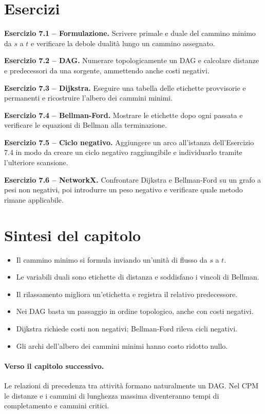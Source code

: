 \documentclass[11pt,a4paper]{article}
\begin{document}
\section{Esercizi}

\textbf{Esercizio 7.1 -- Formulazione.}
Scrivere primale e duale del cammino minimo da $s$ a $t$ e verificare la debole dualità lungo un cammino assegnato.

\medskip\textbf{Esercizio 7.2 -- DAG.}
Numerare topologicamente un DAG e calcolare distanze e predecessori da una sorgente, ammettendo anche costi negativi.

\medskip\textbf{Esercizio 7.3 -- Dijkstra.}
Eseguire una tabella delle etichette provvisorie e permanenti e ricostruire l'albero dei cammini minimi.

\medskip\textbf{Esercizio 7.4 -- Bellman-Ford.}
Mostrare le etichette dopo ogni passata e verificare le equazioni di Bellman alla terminazione.

\medskip\textbf{Esercizio 7.5 -- Ciclo negativo.}
Aggiungere un arco all'istanza dell'Esercizio 7.4 in modo da creare un ciclo negativo raggiungibile e individuarlo tramite l'ulteriore scansione.

\medskip\textbf{Esercizio 7.6 -- NetworkX.}
Confrontare Dijkstra e Bellman-Ford su un grafo a pesi non negativi, poi introdurre un peso negativo e verificare quale metodo rimane applicabile.

\section{Sintesi del capitolo}
\begin{learningbox}
\begin{itemize}[nosep]
\item Il cammino minimo si formula inviando un'unità di flusso da $s$ a $t$.
\item Le variabili duali sono etichette di distanza e soddisfano i vincoli di Bellman.
\item Il rilassamento migliora un'etichetta e registra il relativo predecessore.
\item Nei DAG basta un passaggio in ordine topologico, anche con costi negativi.
\item Dijkstra richiede costi non negativi; Bellman-Ford rileva cicli negativi.
\item Gli archi dell'albero dei cammini minimi hanno costo ridotto nullo.
\end{itemize}
\end{learningbox}

\paragraph{Verso il capitolo successivo.}
Le relazioni di precedenza tra attività formano naturalmente un DAG. Nel CPM le distanze e i cammini di lunghezza massima diventeranno tempi di completamento e cammini critici.
\end{document}
